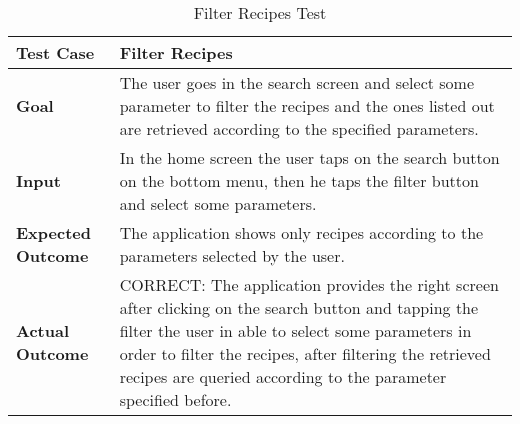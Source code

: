 \begin{table}[H]
	\centering
	\begin{tabular}{|l|l|}
	\hline
	\textbf{Test Case}& Filter Recipes\\
	\hline
	\textbf{Goal}& 
	\begin{minipage}{.7\linewidth}
	The user goes in the search screen and select some parameter to filter the recipes and the ones listed out are retrieved according to the specified parameters.
	\end{minipage}\\
	\hline
	\textbf{Input}& 
	\begin{minipage}{.7\linewidth}
	In the home screen the user taps on the search button on the bottom menu, then he taps the filter button and select some parameters.
	\end{minipage}\\
	\hline
	\textbf{Expected Outcome}& 
	\begin{minipage}{.7\linewidth}
	The application shows only recipes according to the parameters selected by the user.
	\end{minipage}\\
	\hline
	\textbf{Actual Outcome}& 
	\begin{minipage}{.7\linewidth}
	CORRECT: The application provides the right screen after clicking on the search button and tapping the filter the user in able to select some parameters in order to filter the recipes, after filtering the retrieved recipes are queried according to the parameter specified before.
	\end{minipage}\\
	\hline	
	\end{tabular}
	\caption{Filter Recipes Test}
\end{table}


